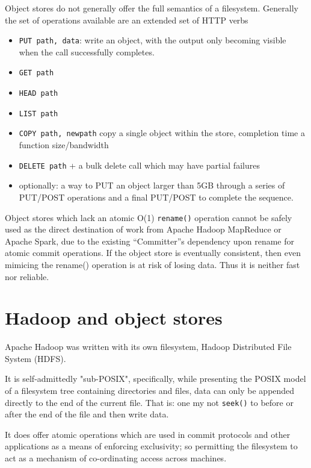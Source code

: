 \documentclass[9pt,technote]{IEEEtran}
\begin{document}
Object stores do not generally offer the full semantics of a filesystem. Generally the set of operations available are an extended set of HTTP verbs
\begin{itemize}
  \item{\texttt{PUT path, data}: write an object, with the output only becoming visible when the call successfully completes.}
  \item{\texttt{GET path}}
  \item{\texttt{HEAD path}}
  \item{\texttt{LIST path}}
  \item{\texttt{COPY path, newpath} copy a single object within the store, completion time a function size/bandwidth}
  \item{\texttt{DELETE path}  + a bulk delete call which may have partial failures}
  \item{optionally: a way to PUT an object larger than 5GB through a series of PUT/POST operations and a final PUT/POST to complete the sequence.}
\end{itemize}

Object stores which lack an atomic O(1) \texttt{rename()} operation cannot be safely used as the direct destination of work from Apache Hadoop MapReduce or Apache Spark, due to the existing ``Committer''s dependency upon rename for atomic commit operations.
If the object store is eventually consistent, then even mimicing the rename() operation is at risk of losing data.
Thus it is neither fast nor reliable.


\section{Hadoop and object stores}

Apache Hadoop was written with its own filesystem, Hadoop Distributed File System (HDFS).

It is self-admittedly "sub-POSIX", specifically, while presenting the POSIX
model of a filesystem tree containing directories and files, data can only be
appended directly to the end of the current file.
That is: one my not \texttt{seek()} to before or after the end of the file and
then write data.

It does offer atomic operations which are used in commit protocols and other
applications as a means of enforcing exclusivity; so permitting the filesystem
to act as a mechanism of co-ordinating access across machines.

\end{document}
